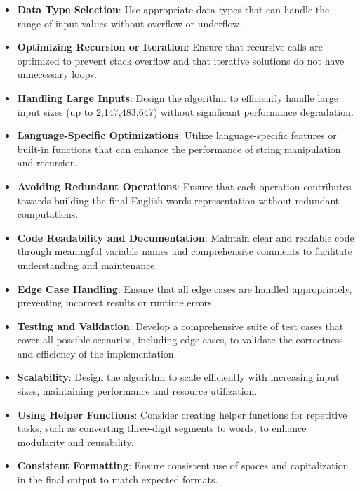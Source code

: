\begin{itemize}
    \item \textbf{Data Type Selection}: Use appropriate data types that can handle the range of input values without overflow or underflow.
    
    \item \textbf{Optimizing Recursion or Iteration}: Ensure that recursive calls are optimized to prevent stack overflow and that iterative solutions do not have unnecessary loops.
    
    \item \textbf{Handling Large Inputs}: Design the algorithm to efficiently handle large input sizes (up to 2,147,483,647) without significant performance degradation.
    
    \item \textbf{Language-Specific Optimizations}: Utilize language-specific features or built-in functions that can enhance the performance of string manipulation and recursion.
    
    \item \textbf{Avoiding Redundant Operations}: Ensure that each operation contributes towards building the final English words representation without redundant computations.
    
    \item \textbf{Code Readability and Documentation}: Maintain clear and readable code through meaningful variable names and comprehensive comments to facilitate understanding and maintenance.
    
    \item \textbf{Edge Case Handling}: Ensure that all edge cases are handled appropriately, preventing incorrect results or runtime errors.
    
    \item \textbf{Testing and Validation}: Develop a comprehensive suite of test cases that cover all possible scenarios, including edge cases, to validate the correctness and efficiency of the implementation.
    
    \item \textbf{Scalability}: Design the algorithm to scale efficiently with increasing input sizes, maintaining performance and resource utilization.
    
    \item \textbf{Using Helper Functions}: Consider creating helper functions for repetitive tasks, such as converting three-digit segments to words, to enhance modularity and reusability.
    
    \item \textbf{Consistent Formatting}: Ensure consistent use of spaces and capitalization in the final output to match expected formats.
\end{itemize}

